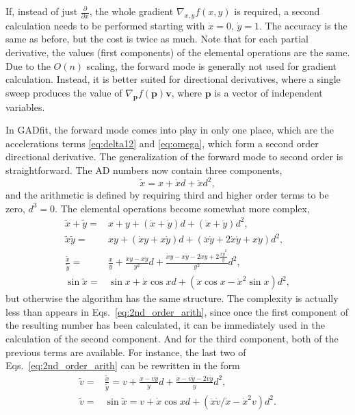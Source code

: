 \documentclass{article}
\begin{document}
If, instead of just $\frac{\partial}{\partial x}$, the whole gradient $\nabla_{x,y}f(x,y)$ is required, a second calculation needs to be performed starting with $\dot x = 0$, $\dot y = 1$. The accuracy is the same as before, but the cost is twice as much. Note that for each partial derivative, the values (first components) of the elemental operations are the same. Due to the $O(n)$ scaling, the forward mode is generally not used for gradient calculation. Instead, it is better suited for directional derivatives, where a single sweep produces the value of $\nabla_{\bm p}f(\bm p)\bm v$, where $\bm p$ is a vector of independent variables.

In GADfit, the forward mode comes into play in only one place, which are the accelerations terms \eqref{eq:delta12} and \eqref{eq:omega}, which form a second order directional derivative. The generalization of the forward mode to second order is straightforward. The AD numbers now contain three components,
\begin{equation}
  \label{eq:adcomplex}
  \tilde x = x + \dot x d + \ddot x d^2,
\end{equation}
and the arithmetic is defined by requiring third and higher order terms to be zero, $d^3 = 0$. The elemental operations become somewhat more complex,
\begin{equation}
  \label{eq:2nd_order_arith}
  \begin{split}
    \tilde x + \tilde y =& x + y + (\dot x + \dot y)d + (\ddot x +
    \ddot y)d^2, \\
    \tilde x\tilde y =& xy + (\dot xy + x\dot y)d +
    (\ddot x\dot y + 2\dot x\dot y + x\ddot y)d^2, \\
    \frac{\tilde x}{\tilde y} =& \frac{x}{y} + \frac{\dot xy-x\dot
      y}{y^2}d + \frac{\ddot xy-x\ddot y-2\dot x\dot y+2\frac{x\dot
        y^2}{y}}{y^2}d^2, \\
    \sin\tilde x =& \sin x + \dot x\cos x d + (\ddot x\cos x - \dot
    x^2\sin x) d^2,
  \end{split}
\end{equation}
but otherwise the algorithm has the same structure. The complexity is actually less than appears in Eqs.~\eqref{eq:2nd_order_arith}, since once the first component of the resulting number has been calculated, it can be immediately used in the calculation of the second component. And for the third component, both of the previous terms are available. For instance, the last two of Eqs.~\eqref{eq:2nd_order_arith} can be rewritten in the form
\begin{equation}
  \label{eq:2nd_order_arith_compact}
  \begin{split}
    \tilde v =& \frac{\tilde x}{\tilde y} = v + \frac{\dot x-v\dot
      y}{y}d + \frac{\ddot x-v\ddot y-2\dot v\dot y}{y}d^2, \\
    \tilde v =& \sin\tilde x = v + \dot x\cos x d + (\ddot x\dot
    v/\dot x - \dot x^2v) d^2.
  \end{split}
\end{equation}
\end{document}
